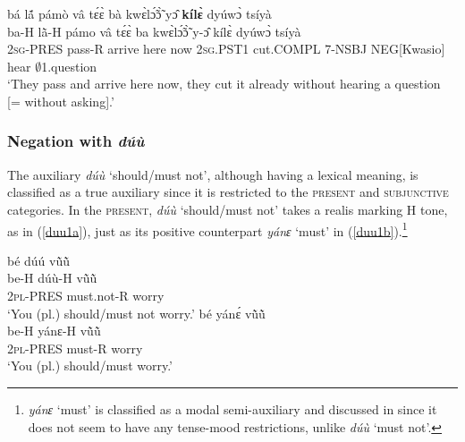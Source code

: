 \begin{exe} 
\ex\label{ti6} 
  \glll bá lã́ pámò vâ tɛ́ɛ̀ bà kwɛ̀lɔ̃́ɔ̃̀ yɔ̂ {\bfseries kílɛ̀} dyúwɔ̀  tsíyà \\
      ba-H lã̀-H pámo vâ tɛ́ɛ̀ ba kwɛ̀lɔ̃́ɔ̃̀ y-ɔ̂ kílɛ̀ dyúwɔ̀  tsíyà \\
       2\textsc{sg}-PRES pass-R arrive here now 2\textsc{sg}.PST1 cut.COMPL 7-NSBJ NEG[Kwasio] hear $\emptyset$1.question  \\
    \trans `They pass and arrive here now, they cut it already without hearing a question [= without asking].'
\end{exe}











\subsubsection{Negation with {\itshape dúù}}
\label{sec:NEGduu}

The auxiliary {\itshape dúù} `should/must not', although having a lexical meaning, is classified as a true auxiliary since it is restricted to the \textsc{present} and \textsc{subjunctive} categories. In the \textsc{present}, {\itshape dúù} `should/must not' takes a realis marking H tone, as in (\ref{duu1a}), just as its positive counterpart {\itshape yánɛ} `must' in (\ref{duu1b}).\footnote{{\itshape yánɛ} `must' is classified as a modal semi-auxiliary and discussed in  since it does not seem to have any tense-mood restrictions, unlike {\itshape dúù} `must not'.}


\begin{exe} 
\ex \label{duu1}
\begin{xlist}
\ex\label{duu1a}
  \glll bé dúú vũ̀ũ̀\\
      be-H dúù-H vũ̀ũ̀ \\
        2\textsc{pl}-PRES must.not-R worry \\
    \trans `You (pl.) should/must not worry.'
\ex\label{duu1b}
  \glll bé yánɛ́ vũ̀ũ̀ \\
      be-H yánɛ-H vũ̀ũ̀ \\
        2\textsc{pl}-PRES must-R worry \\
    \trans `You (pl.) should/must worry.'
\end{xlist}
\end{exe}

